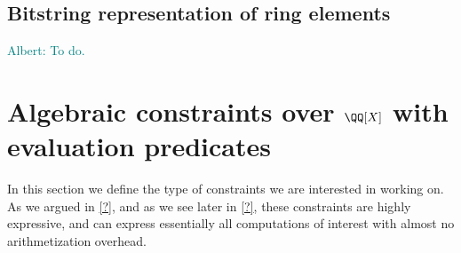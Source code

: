 \documentclass[11pt,letterpaper,usenames,dvipsnames]{article}
\newcommand{\albert}[1]{\textcolor{teal}{Albert: {#1}}}
\begin{document}
\subsection{Bitstring representation of ring elements}\label{s: bistring_reps}
\albert{To do.}

\section{Algebraic constraints over $\QQ[X]$ with evaluation predicates}

In this section we define the type of constraints we are interested in working on. As we argued in \cref{?}, and as we see later in \cref{?}, these constraints are highly expressive, and can  express essentially all computations of interest with almost no arithmetization overhead.

\newcommand{\evalconstraints}{\text{\emph{Eval}}}
\newcommand{\mainQpolyring}{(\QQ[X]_{\leq B})}
\newcommand{\mainQpolyringmultilin}{(\QQ[X]_{\leq B})^{\multilin}}

\end{document}

